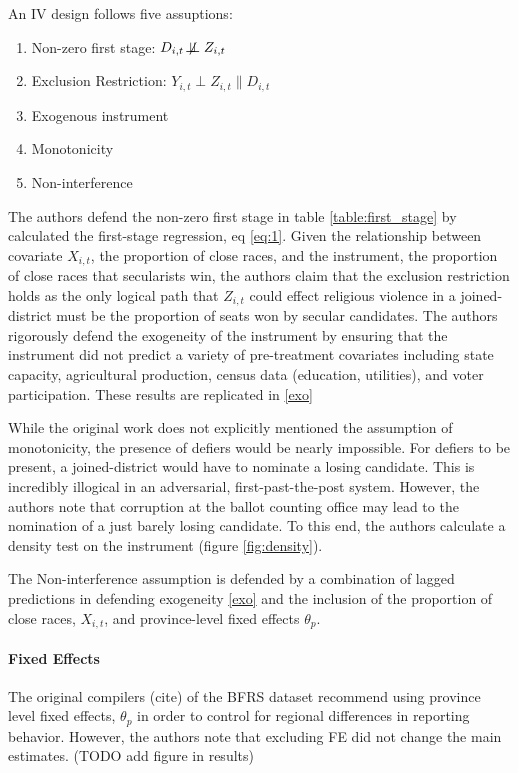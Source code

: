 \documentclass{scrartcl}
\begin{document}
An IV design follows five assuptions:

\begin{enumerate}
\item{Non-zero first stage: $D_{i,t} \not\!\perp\!\!\!\perp Z_{i,t}$}
\item{Exclusion Restriction: $Y_{i,t} \perp Z_{i,t} \| D_{i,t}$}
\item{Exogenous instrument}
\item{Monotonicity}
\item{Non-interference}
\end{enumerate}

The authors defend the non-zero first stage in table \ref{table:first_stage} by calculated the first-stage regression, eq \ref{eq:1}.
Given the relationship between covariate $X_{i,t}$, the proportion of close races, and the instrument, the proportion of close races that secularists win, the authors claim that the exclusion restriction holds as the only logical path that $Z_{i,t}$ could effect religious violence in a joined-district must be the proportion of seats won by secular candidates.
The authors rigorously defend the exogeneity of the instrument by ensuring that the instrument did not predict a variety of pre-treatment covariates including state capacity, agricultural production, census data (education, utilities), and voter participation. These results are replicated in \ref{exo}

While the original work does not explicitly mentioned the assumption of monotonicity, the presence of defiers would be nearly impossible.
For defiers to be present, a joined-district would have to nominate a losing candidate.
This is incredibly illogical in an adversarial, first-past-the-post system.
However, the authors note that corruption at the ballot counting office may lead to the nomination of a just barely losing candidate.
To this end, the authors calculate a density test on the instrument (figure \ref{fig:density}).

The Non-interference assumption is defended by a combination of lagged predictions in defending exogeneity \ref{exo} and the inclusion of the proportion of close races, $X_{i,t}$, and province-level fixed effects $\theta_p$.

\paragraph{Fixed Effects}
The original compilers (cite) of the BFRS dataset recommend using province level fixed effects, $\theta_p$ in order to control for regional differences in reporting behavior.
However, the authors note that excluding FE did not change the main estimates. (TODO add figure in results)
\end{document}

